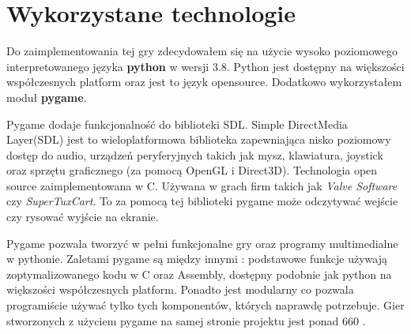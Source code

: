 \documentclass[a4paper,12pt,oneside]{book}
\begin{document}
\section{Wykorzystane technologie}
Do zaimplementowania tej gry zdecydowałem się na użycie wysoko poziomowego
interpretowanego języka \textbf{python} w wersji 3.8. Python jest dostępny na
większości współczesnych platform oraz jest to język  open\dywiz source.
Dodatkowo wykorzystałem moduł \textbf{pygame}.

Pygame dodaje funkcjonalność do biblioteki SDL. Simple DirectMedia Layer(SDL)
jest to wieloplatformowa biblioteka zapewniająca nisko poziomowy dostęp do
audio, urządzeń peryferyjnych takich jak mysz, klawiatura, joystick oraz
sprzętu graficznego (za pomocą OpenGL i Direct3D). Technologia open source
zaimplementowana w C. Używana w grach firm takich jak \textit{Valve Software}
czy \textit{SuperTuxCart}\cite{sdl_ref}. To za pomocą tej biblioteki pygame
może odczytywać wejście czy rysować wyjście na ekranie.

Pygame pozwala tworzyć w pełni funkcjonalne gry oraz programy multimedialne
w pythonie. Zaletami pygame są między innymi : podstawowe funkcje używają
zoptymalizowanego kodu w C oraz Assembly, dostępny podobnie jak python na
większości współczesnych platform. Ponadto jest modularny co pozwala
programiście używać tylko tych komponentów, których naprawdę potrzebuje.
Gier stworzonych z użyciem pygame na samej stronie projektu jest ponad 660
\cite{pygame_about_ref}.
\end{document}
